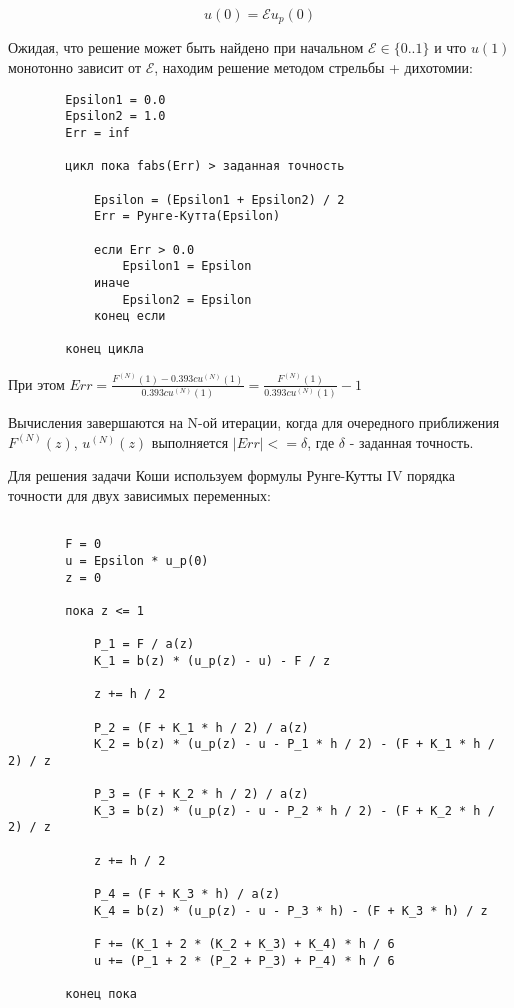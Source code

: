 \documentclass[a4paper,12pt]{article}
\begin{document}
    \begin{equation*}
        u(0)=\mathcal{E}u_p(0)
    \end{equation*}

    Ожидая, что решение может быть найдено при начальном $\mathcal{E}\in\{0..1\}$
    и что $u(1)$ монотонно зависит от $\mathcal{E}$,
    находим решение методом стрельбы + дихотомии:

    \begin{verbatim}
        Epsilon1 = 0.0
        Epsilon2 = 1.0
        Err = inf

        цикл пока fabs(Err) > заданная точность

            Epsilon = (Epsilon1 + Epsilon2) / 2
            Err = Рунге-Кутта(Epsilon)

            если Err > 0.0
                Epsilon1 = Epsilon
            иначе
                Epsilon2 = Epsilon
            конец если

        конец цикла
    \end{verbatim}

    При этом $Err = \frac{F^{(N)}(1) - 0.393cu^{(N)}(1)}{0.393cu^{(N)}(1)} =
    \frac{F^{(N)}(1)}{0.393cu^{(N)}(1)} - 1$

    Вычисления завершаются на N-ой итерации, когда для очередного приближения 
    $F^{(N)}(z)$, $u^{(N)}(z)$ выполняется
    $\left\lvert Err \right\rvert<= \delta$, 
    где $\delta$ - заданная точность.

    \newpage
    Для решения задачи Коши используем формулы Рунге-Кутты IV порядка точности 
    для двух зависимых переменных:

    \begin{verbatim}

        F = 0
        u = Epsilon * u_p(0)
        z = 0

        пока z <= 1

            P_1 = F / a(z)
            K_1 = b(z) * (u_p(z) - u) - F / z

            z += h / 2

            P_2 = (F + K_1 * h / 2) / a(z)
            K_2 = b(z) * (u_p(z) - u - P_1 * h / 2) - (F + K_1 * h / 2) / z

            P_3 = (F + K_2 * h / 2) / a(z)
            K_3 = b(z) * (u_p(z) - u - P_2 * h / 2) - (F + K_2 * h / 2) / z

            z += h / 2

            P_4 = (F + K_3 * h) / a(z)
            K_4 = b(z) * (u_p(z) - u - P_3 * h) - (F + K_3 * h) / z

            F += (K_1 + 2 * (K_2 + K_3) + K_4) * h / 6
            u += (P_1 + 2 * (P_2 + P_3) + P_4) * h / 6

        конец пока
    \end{verbatim}
\end{document}
